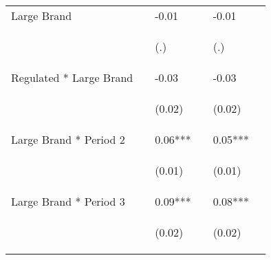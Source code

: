 \documentclass[12pt]{article}
\begin{document}
\begin{center}
\begin{longtable}{p{}p{}p{}p{}p{}p{}}
Large Brand &  & -0.01 &  & -0.01 \\
\vspace{2pt} & \begin{footnotesize}\end{footnotesize} & \begin{footnotesize}(.)\end{footnotesize} & \begin{footnotesize}\end{footnotesize} & \begin{footnotesize}(.)\end{footnotesize} \\
Regulated * Large Brand &  & -0.03 &  & -0.03 \\
\vspace{2pt} & \begin{footnotesize}\end{footnotesize} & \begin{footnotesize}(0.02)\end{footnotesize} & \begin{footnotesize}\end{footnotesize} & \begin{footnotesize}(0.02)\end{footnotesize} \\
Large Brand * Period 2 &  & 0.06*** &  & 0.05*** \\
\vspace{2pt} & \begin{footnotesize}\end{footnotesize} & \begin{footnotesize}(0.01)\end{footnotesize} & \begin{footnotesize}\end{footnotesize} & \begin{footnotesize}(0.01)\end{footnotesize} \\
Large Brand * Period 3 &  & 0.09*** &  & 0.08*** \\
\vspace{2pt} & \begin{footnotesize}\end{footnotesize} & \begin{footnotesize}(0.02)\end{footnotesize} & \begin{footnotesize}\end{footnotesize} & \begin{footnotesize}(0.02)\end{footnotesize} \\

\end{longtable}
\end{center}
\end{document}
